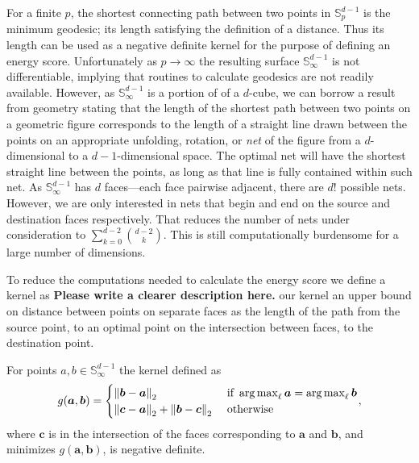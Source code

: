 For a finite $p$, the shortest connecting path between two points in 
${\mathbb S}_p^{d-1}$ is the minimum geodesic; its length satisfying 
the definition of a distance.  Thus its length can be used as a negative definite kernel for the purpose of defining an energy score. Unfortunately as $p\to\infty$ the resulting surface ${\mathbb S}_{\infty}^{d-1}$ is not differentiable, implying that routines to calculate geodesics are not readily available.  However, as ${\mathbb S}_{\infty}^{d-1}$ is a portion of of a $d$-cube, we can borrow a result from geometry \citep{pappas1989} stating that the length of the shortest path between two points on a geometric figure corresponds to the length of a straight line drawn between the points on an appropriate unfolding, rotation, or \emph{net} of the figure from a $d$-dimensional to a $d-1$-dimensional space.  The optimal net will have the shortest straight line between the points, as long as that line is fully contained within such net. As ${\mathbb S}_{\infty}^{d-1}$ has $d$ faces---each face pairwise adjacent, there are $d!$ possible nets.  However, we are only interested in nets that begin and end on the source and destination faces respectively.  That reduces the number of nets under consideration to $\sum_{k = 0}^{d-2}\binom{d-2}{k}$.  This is still computationally burdensome for a large number of dimensions.  

To reduce the computations needed to calculate the energy score we define a kernel as {\bf Please write a clearer description here.} our kernel an upper bound on distance between points on separate faces as the length of the path from the source point, to an optimal point on the intersection between faces, to the destination point.
\begin{prop}\label{prop:g}
For points $a,b \in {\mathbb S}_{\infty}^{d-1}$ the kernel defined as  
  \begin{equation}
    g(\bm{a},\bm{b}) = \begin{cases}
        \pnorm{\bm{b}-\bm{a}}{2} &\text{ if }\argmax_{\ell}\bm{a} = \argmax_{\ell}\bm{b}\\
        \pnorm{\bm{c}-\bm{a}}{2} + \pnorm{\bm{b}-\bm{c}}{2} &\text{ otherwise}
    \end{cases} ,
  \end{equation}
  where $\bm{c}$ is in the intersection of the faces corresponding to $\bm{a}$ and $\bm{b}$, and minimizes $g(\bm{a},\bm{b})$, is negative definite.
\end{prop}

